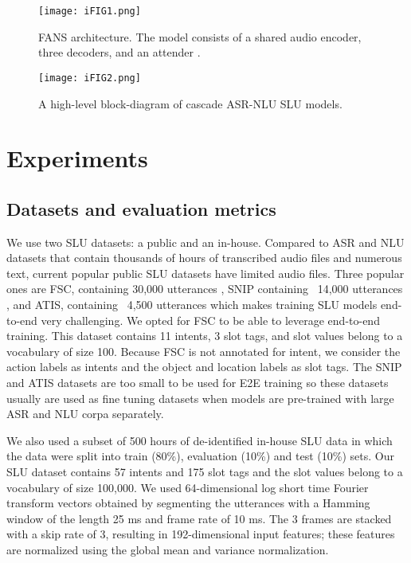 \documentclass[a4paper]{article}
\begin{document}
 \begin{figure}[t]
  \centering
  \texttt{[image: iFIG1.png]}
  \caption{ FANS architecture. The model consists of a shared audio encoder, three decoders, and an attender .}
  \label{fig:fans}
\end{figure}




\begin{figure}[t]
  \centering
  \texttt{[image: iFIG2.png]}
  \caption{ A high-level block-diagram of cascade ASR-NLU SLU models.}
  \label{fig:slutask}
\end{figure}


 


 \section{Experiments}
 \subsection{Datasets and evaluation metrics}
 We use  two SLU datasets:  a public and  an  in-house. Compared to ASR and NLU datasets that contain thousands of  hours of transcribed audio files and numerous text, current popular public SLU  datasets have limited audio files. Three popular ones are FSC,  containing 30,000 utterances \cite{lugosch2019speech}, SNIP containing ~14,000 utterances \cite{coucke2018snips}, and ATIS, containing ~4,500 utterances \cite{price1990evaluation} which makes training SLU models end-to-end very challenging.   We opted for FSC  \cite{lugosch2019speech}  to be able to leverage end-to-end training. This dataset contains 11 intents, 3 slot tags, and slot values belong to a vocabulary of size 100. Because FSC is not annotated for intent, we consider the action labels as intents and the object and location labels as slot tags.  The SNIP and ATIS datasets are too small to be used for E2E training so these datasets usually are used as fine tuning datasets when models are pre-trained with large ASR and NLU corpa separately.
 
 We also used a subset of  500 hours of de-identified in-house SLU data in which  the data were split into  train (80\%), evaluation (10\%) and test (10\%) sets. Our SLU dataset contains 57 intents and 175 slot tags and the slot values belong to a vocabulary of size 100,000. We used 64-dimensional log short time Fourier transform  vectors obtained by segmenting the utterances with a Hamming window of the length 25 ms and frame rate of 10 ms. The 3 frames are stacked with a skip rate of 3, resulting  in 192-dimensional input features; these features are normalized using the global mean and variance normalization.
 
\end{document}

